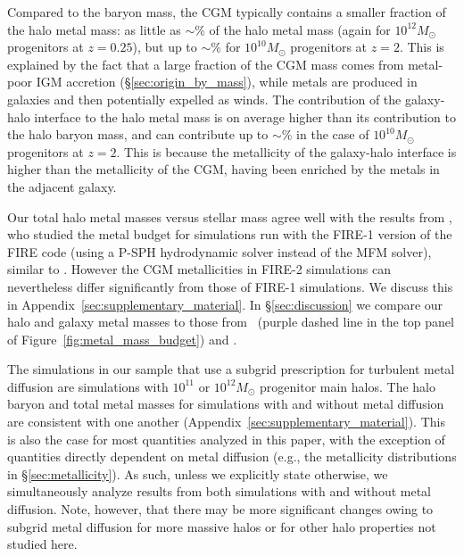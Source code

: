 \documentclass[fleqn,usenatbib]{mnras}
\begin{document}
Compared to the baryon mass, the CGM typically contains a smaller fraction of the halo metal mass: as little as $\sim$\fmetCGMMWmeanlow\% of the halo metal mass (again for $10^{12} M_\odot$ progenitors at $z=0.25$), but up to $\sim$\fmetCGMdwarfmeanhigh\% for $10^{10} M_\odot$ progenitors at $z=2$.
This is explained by the fact that a large fraction of the CGM mass comes from metal-poor IGM accretion (\S\ref{sec:origin_by_mass}), while metals are produced in galaxies and then potentially expelled as winds.
The contribution of the galaxy-halo interface to the halo metal mass is on average higher than its contribution to the halo baryon mass, and can contribute up to $\sim$\fmetinterfacedwarfmeanhigh\% in the case of  $10^{10} M_\odot$ progenitors at $z=2$.
This is because the metallicity of the galaxy-halo interface is higher than the metallicity of the CGM, having been enriched by the metals in the adjacent galaxy.

Our total halo metal masses versus stellar mass agree well with the results from \cite{Ma2015}, who studied the metal budget for simulations run with the FIRE-1 version of the FIRE code (using a P-SPH hydrodynamic solver instead of the MFM solver), similar to \cite{Muratov2016}. 
However the CGM metallicities in FIRE-2 simulations can nevertheless differ significantly from those of FIRE-1 simulations.
We discuss this in Appendix~\ref{sec:supplementary_material}. 
In \S\ref{sec:discussion} we compare our halo and galaxy metal masses to those from~\cite{Peeples2014} (purple dashed line in the top panel of Figure~\ref{fig:metal_mass_budget}) and \cite{Christensen2018}.

The simulations in our sample that use a subgrid prescription for turbulent metal diffusion are simulations with $10^{11}$ or $10^{12} M_\odot$ progenitor main halos. 
The halo baryon and total metal masses for simulations with and without metal diffusion are consistent with one another (Appendix~\ref{sec:supplementary_material}).
This is also the case for most quantities analyzed in this paper, with the exception of quantities directly dependent on metal diffusion (e.g., the metallicity distributions in \S\ref{sec:metallicity}).
As such, unless we explicitly state otherwise, we simultaneously analyze results from both simulations with and without metal diffusion. 
Note, however, that there may be more significant changes owing to subgrid metal diffusion for more massive halos or for other halo properties not studied here.
\end{document}
